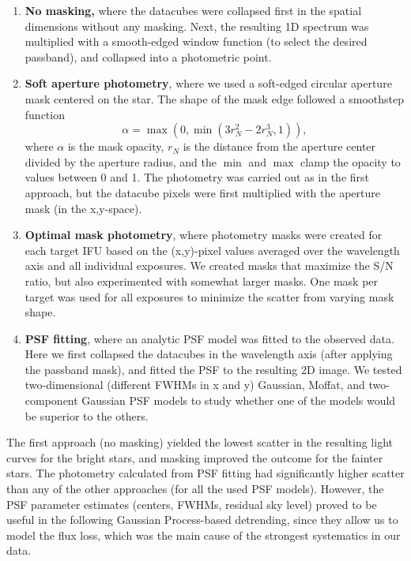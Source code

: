 \documentclass[useAMS,usenatbib]{mn2e}
\begin{document}
\begin{enumerate}
 \item \textbf{No masking,} where the datacubes were collapsed first in the spatial dimensions without any masking. 
    Next, the resulting 1D spectrum was multiplied with a smooth-edged window function (to select the desired 
    passband), and collapsed into a photometric point.
 \item \textbf{Soft aperture photometry}, where we used a soft-edged circular aperture mask centered on the star. The 
    shape of the mask edge followed a smoothstep function
 \begin{equation}
  \alpha = \max\left(0, \min\left(3r_N^2 - 2r_N^3, 1\right)\right),
 \end{equation}
    where $\alpha$ is the mask opacity, $r_N$ is the distance from the aperture center divided by the aperture radius, 
    and the $\min$ and $\max$ clamp the opacity to values between 0 and 1. The photometry was carried out as in the 
    first approach, but the datacube pixels were first multiplied with the aperture mask (in the x,y-space).
 
    \item \textbf{Optimal mask photometry}, where photometry masks were created for each target IFU based on the 
    (x,y)-pixel values averaged over the wavelength axis and all individual exposures. We created masks that 
    maximize the S/N ratio, but also experimented with somewhat larger masks. One mask per target was used for all 
exposures to 
    minimize the scatter from varying mask shape.
 
 \item \textbf{PSF fitting}, where an analytic PSF model was fitted to the observed data. Here we first collapsed the 
  datacubes in the wavelength axis (after applying the passband mask), and fitted the PSF to the resulting 2D image. We 
  tested two-dimensional (different FWHMs in x and y) Gaussian, Moffat, and two-component Gaussian PSF models to study 
  whether one of the models would be superior to the others. 
\end{enumerate}
The first approach (no masking) yielded the lowest scatter in the resulting light curves for the bright stars, and 
masking improved the outcome for the fainter stars. The photometry calculated from PSF fitting had significantly higher 
scatter than any of the other approaches (for all the used PSF models). However, the PSF parameter estimates (centers, 
FWHMs, residual sky level) proved to be useful in the following Gaussian Process-based detrending, since they allow us 
to model the flux loss, which was the main cause of the strongest systematics in our data.
\end{document}
